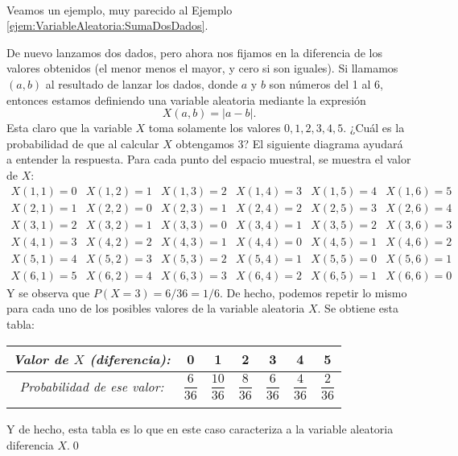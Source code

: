\begin{itemize}
{{\begin{minipage}{14cm}
\begin{enumerate}
        \end{enumerate}
        \end{minipage}}}\\[3mm]
        Veamos un ejemplo, muy parecido al Ejemplo \ref{ejem:VariableAleatoria:SumaDosDados}.
        \begin{Ejemplo}\label{ejem:VariableAleatoria:RestaDosDados}
            De nuevo lanzamos dos dados, pero ahora nos fijamos en la diferencia de los valores obtenidos (el menor menos el mayor, y cero si son iguales). Si llamamos $(a,b)$ al resultado de lanzar los dados, donde $a$ y $b$ son números del 1 al 6, entonces estamos definiendo una variable aleatoria mediante la expresión
            \[X(a,b)=|a-b|.\]
            Esta claro que la variable $X$ toma solamente los valores $0,1,2,3,4,5$. ¿Cuál es la probabilidad de que al calcular $X$ obtengamos $3$? El siguiente diagrama ayudará a entender la respuesta. Para cada punto del espacio muestral,  se muestra el valor de $X$:
            \[
            \begin{array}{cccccc}
            X(1,1)=0&X(1,2)=1&X(1,3)=2&X(1,4)=3&X(1,5)=4&X(1,6)=5\\
            X(2,1)=1&X(2,2)=0&X(2,3)=1&X(2,4)=2&X(2,5)=3&X(2,6)=4\\
            X(3,1)=2&X(3,2)=1&X(3,3)=0&X(3,4)=1&X(3,5)=2&X(3,6)=3\\
            X(4,1)=3&X(4,2)=2&X(4,3)=1&X(4,4)=0&X(4,5)=1&X(4,6)=2\\
            X(5,1)=4&X(5,2)=3&X(5,3)=2&X(5,4)=1&X(5,5)=0&X(5,6)=1\\
            X(6,1)=5&X(6,2)=4&X(6,3)=3&X(6,4)=2&X(6,5)=1&X(6,6)=0
            \end{array}
            \]
            Y se observa que $P(X=3)=6/36=1/6$. De hecho, podemos repetir lo mismo para cada uno de los posibles valores de la variable aleatoria $X$. Se obtiene esta tabla:
            \begin{center}
            \begin{tabular}[t]{|c|c|c|c|c|c|c|}
            \hline
            \rule{0cm}{0.5cm}{\em Valor de $X$ (diferencia):}&0&1&2&3&4&5\\
            \hline
            \rule{0cm}{0.7cm}{\em Probabilidad de ese valor:}&$\dfrac{6}{36}$&$\dfrac{10}{36}$&$\dfrac{8}{36}$&$\dfrac{6}{36}$&$\dfrac{4}{36}$&$\dfrac{2}{36}$\\
            &&&&&&\\
            \hline
            \end{tabular}
            \end{center}
        Y de hecho, esta tabla es lo que en este caso caracteriza a la variable aleatoria diferencia $X$.\qed
        \end{Ejemplo}

\end{itemize}

